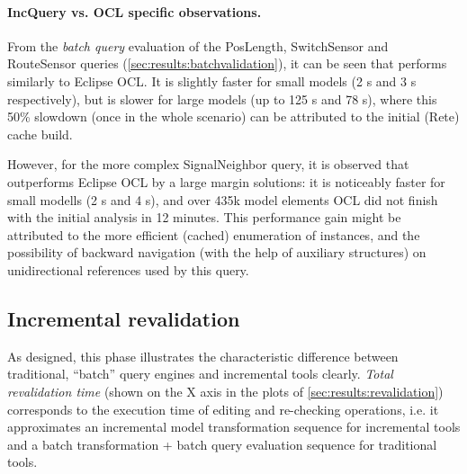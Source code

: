 \paragraph{IncQuery vs. OCL specific observations.}

 
From the \emph{batch query} evaluation of the \textsf{PosLength},
\textsf{SwitchSensor} and \textsf{RouteSensor} queries
(\autoref{sec:results:batchvalidation}), it can be seen that \eiq{} performs
similarly to Eclipse OCL. It is slightly faster for small models (2 s and 3 s
respectively), but is slower for large models (up to 125 s and 78 s), where this
50\% slowdown (once in the whole scenario) can be attributed to the initial
(Rete) cache build.


However, for the more complex \textsf{SignalNeighbor} query, it is observed that
\eiq{} outperforms Eclipse OCL by a large margin solutions: it is noticeably
faster for small modells (2 s and 4 s), and over 435k model elements OCL did not
finish with the initial analysis in 12 minutes. This performance gain might be
attributed to the more efficient (cached) enumeration of instances, and the
possibility of backward navigation (with the help of auxiliary structures) on
unidirectional references used by this query.



\subsection{Incremental revalidation}
As designed, this phase illustrates the characteristic difference between traditional, ``batch'' query engines and incremental tools clearly. \emph{Total revalidation time} (shown on the X axis in the plots of \autoref{sec:results:revalidation}) corresponds to the execution time of editing and re-checking operations, i.e. it approximates an incremental model transformation sequence for incremental tools and a batch transformation + batch query evaluation sequence for traditional tools.

